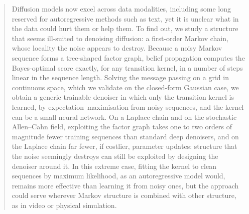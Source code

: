 \documentclass{article}
\begin{document}

\printAffiliationsAndNotice{}

\begin{abstract}
Diffusion models now excel across data modalities, including some long reserved for autoregressive methods such as text, yet it is unclear what in the data could hurt them or help them. To find out, we study a structure that seems ill-suited to denoising diffusion: a first-order Markov chain, whose locality the noise appears to destroy. Because a noisy Markov sequence forms a tree-shaped factor graph, belief propagation computes the Bayes-optimal score exactly, for any transition kernel, in a number of steps linear in the sequence length. Solving the message passing on a grid in continuous space, which we validate on the closed-form Gaussian case, we obtain a generic trainable denoiser in which only the transition kernel is learned, by expectation--maximisation from noisy sequences, and the kernel can be a small neural network. On a Laplace chain and on the stochastic Allen--Cahn field, exploiting the factor graph takes one to two orders of magnitude fewer training sequences than standard deep denoisers, and on the Laplace chain far fewer, if costlier, parameter updates: structure that the noise seemingly destroys can still be exploited by designing the denoiser around it. In this extreme case, fitting the kernel to clean sequences by maximum likelihood, as an autoregressive model would, remains more effective than learning it from noisy ones, but the approach could serve wherever Markov structure is combined with other structure, as in video or physical simulation.
\end{abstract}
\end{document}
